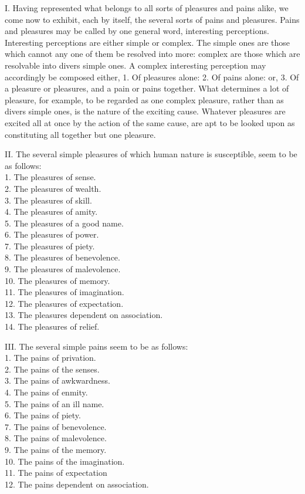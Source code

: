 \documentclass[12pt]{report}
\begin{document}
I. Having represented what belongs to all sorts of pleasures and pains
alike, we come now to exhibit, each by itself, the several sorts of
pains and pleasures. Pains and pleasures may be called by one general
word, interesting perceptions. Interesting perceptions are either simple
or complex. The simple ones are those which cannot any one of them be
resolved into more: complex are those which are resolvable into divers
simple ones. A complex interesting perception may accordingly be
composed either, 1. Of pleasures alone: 2. Of pains alone: or, 3. Of a
pleasure or pleasures, and a pain or pains together. What determines a
lot of pleasure, for example, to be regarded as one complex pleasure,
rather than as divers simple ones, is the nature of the exciting cause.
Whatever pleasures are excited all at once by the action of the same
cause, are apt to be looked upon as constituting all together but one
pleasure.

II. The several simple pleasures of which human nature is susceptible,
seem to be as follows:\\
1. The pleasures of sense.\\
2. The pleasures of wealth.\\
3. The pleasures of skill.\\
4. The pleasures of amity.\\
5. The pleasures of a good name.\\
6. The pleasures of power.\\
7. The pleasures of piety.\\
8. The pleasures of benevolence.\\
9. The pleasures of malevolence.\\
10. The pleasures of memory.\\
11. The pleasures of imagination.\\
12. The pleasures of expectation.\\
13. The pleasures dependent on association.\\
14. The pleasures of relief.

III. The several simple pains seem to be as follows:\\
1. The pains of privation.\\
2. The pains of the senses.\\
3. The pains of awkwardness.\\
4. The pains of enmity.\\
5. The pains of an ill name.\\
6. The pains of piety.\\
7. The pains of benevolence.\\
8. The pains of malevolence.\\
9. The pains of the memory.\\
10. The pains of the imagination.\\
11. The pains of expectation\\
12. The pains dependent on association.
\end{document}
